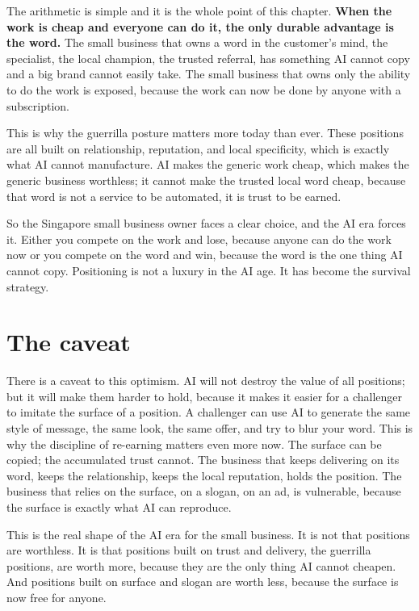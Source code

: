\documentclass[10pt,twoside,openany]{memoir}
\newcommand{\needspacehead}{\needspace{4\baselineskip}}
\let\oldsection\section
\renewcommand{\section}{\needspacehead\oldsection}
\begin{document}
{The arithmetic is simple and it is the whole point of this chapter.
\textbf{When the work is cheap and everyone can do it, the only durable
advantage is the word.} The small business that owns a word in the
customer's mind, the specialist, the local champion, the trusted
referral, has something AI cannot copy and a big brand cannot easily
take. The small business that owns only the ability to do the work is
exposed, because the work can now be done by anyone with a subscription.

This is why the guerrilla posture matters more today than ever. These
positions are all built on relationship, reputation, and local
specificity, which is exactly what AI cannot manufacture. AI makes the
generic work cheap, which makes the generic business worthless; it
cannot make the trusted local word cheap, because that word is not a
service to be automated, it is trust to be earned.

So the Singapore small business owner faces a clear choice, and the AI
era forces it. Either you compete on the work and lose, because anyone
can do the work now or you compete on the word and win, because the word
is the one thing AI cannot copy. Positioning is not a luxury in the AI
age. It has become the survival strategy.

\section{The caveat}\label{the-caveat-1}

There is a caveat to this optimism. AI will not destroy the value of all
positions; but it will make them harder to hold, because it makes it
easier for a challenger to imitate the surface of a position. A
challenger can use AI to generate the same style of message, the same
look, the same offer, and try to blur your word. This is why the
discipline of re-earning matters even more now. The surface can be
copied; the accumulated trust cannot. The business that keeps delivering
on its word, keeps the relationship, keeps the local reputation, holds
the position. The business that relies on the surface, on a slogan, on
an ad, is vulnerable, because the surface is exactly what AI can
reproduce.

This is the real shape of the AI era for the small business. It is not
that positions are worthless. It is that positions built on trust and
delivery, the guerrilla positions, are worth more, because they are the
only thing AI cannot cheapen. And positions built on surface and slogan
are worth less, because the surface is now free for anyone.

}
\end{document}
